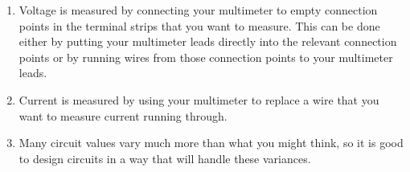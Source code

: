 \begin{enumerate}
\item Voltage is measured by connecting your multimeter to empty connection points in the terminal strips that you want to measure.  This can be done either by putting your multimeter leads directly into the relevant connection points or by running wires from those connection points to your multimeter leads.
\item Current is measured by using your multimeter to replace a wire that you want to measure current running through.
\item Many circuit values vary much more than what you might think, so it is good to design circuits in a way that will handle these variances.
\end{enumerate}

\applysection


